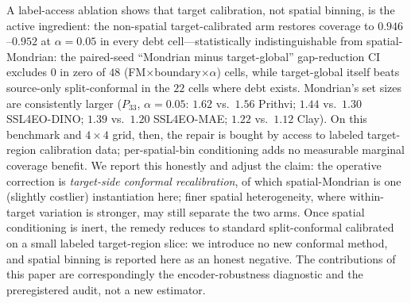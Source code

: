 \documentclass[journal]{IEEEtran}
\renewcommand{\_}{\textunderscore\allowbreak}
\begin{document}
A label-access ablation shows that target calibration, not spatial binning, is the active ingredient: the
non-spatial target-calibrated arm restores coverage to $0.946$--$0.952$ at $\alpha=0.05$ in every debt
cell---statistically indistinguishable from spatial-Mondrian: the paired-seed ``Mondrian minus
target-global'' gap-reduction CI excludes $0$ in zero of $48$ (FM$\times$boundary$\times\alpha$)
cells, while target-global itself beats source-only split-conformal in the $22$ cells where debt exists.
Mondrian's set sizes are consistently larger ($P_{33}$, $\alpha=0.05$: $1.62$ vs.\ $1.56$ Prithvi;
$1.44$ vs.\ $1.30$ SSL4EO-DINO; $1.39$ vs.\ $1.20$ SSL4EO-MAE; $1.22$ vs.\ $1.12$ Clay). On this benchmark
and $4\times4$ grid, then, the repair is bought by access to labeled target-region calibration data;
per-spatial-bin conditioning adds no measurable marginal coverage benefit. We report this honestly and
adjust the claim: the operative correction is \emph{target-side conformal recalibration}, of which
spatial-Mondrian is one (slightly costlier) instantiation here; finer spatial heterogeneity, where
within-target variation is stronger, may still separate the two arms. Once spatial conditioning is inert,
the remedy reduces to standard split-conformal calibrated on a small labeled target-region slice: we
introduce no new conformal method, and spatial binning is reported here as an honest negative. The
contributions of this paper are correspondingly the encoder-robustness diagnostic and the
preregistered audit, not a new estimator.
\end{document}
